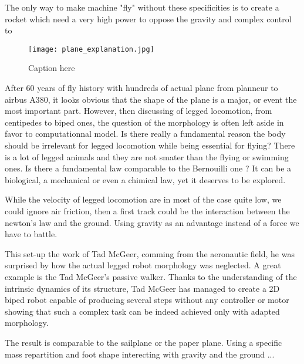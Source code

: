 The only way to make machine "fly" without these specificities is to create a rocket which need a very high power to oppose the gravity and complex control to

\begin{figure}[tb]
    \begin{center}
        \texttt{[image: plane\_explanation.jpg]}
    \end{center}
    \caption{Caption here}
    \label{fig:magic_plane}
\end{figure}

\begin{figure}[]
\centering
    \hfil
    \caption{}
    \label{fig:}
\end{figure}

After 60 years of fly history with hundreds of actual plane from planneur to airbus A380, it looks obvious that the shape of the plane is a major, or event the most important part. However, then discussing of legged locomotion, from centipedes to biped ones, the question of the morphology is often left aside in favor to computationnal model. Is there really a fundamental reason the body should be irrelevant for legged locomotion while being essential for flying? There is a lot of legged animals and they are not smater than the flying or swimming ones. Is there a fundamental law comparable to the Bernouilli one ? It can be a biological, a mechanical or even a chimical law, yet it deserves to be explored.

While the velocity of legged locomotion are in most of the case quite low, we could ignore air friction, then a first track could be the interaction between the newton's law and the ground. Using gravity as an advantage instead of a force we have to battle.

This set-up the work of Tad McGeer, comming from the aeronautic field, he was surprised by how the actual legged robot morphology was neglected. A great example is the Tad McGeer's passive walker. Thanks to the understanding of the intrinsic dynamics of its structure, Tad McGeer has managed to create a 2D biped robot capable of producing several steps without any controller or motor showing that such a complex task can be indeed achieved only with adapted morphology\cite{mcgeer1990passive}.

The result is comparable to the sailplane or the paper plane. Using a specific mass repartition and foot shape interecting with gravity and the ground ...

